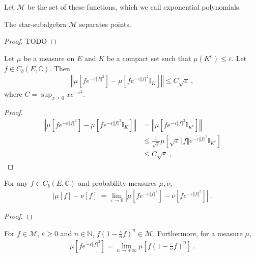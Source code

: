 Let $\mathcal M$ be the set of these functions, which we call exponential polynomials.

\begin{lemma}\label{lem:separating_expPoly}
The star-subalgebra $\mathcal M$ separates points.
\end{lemma}

\begin{proof}
TODO
\end{proof}

\begin{lemma}\label{lem:integral_restrict_compact}
Let $\mu$ be a measure on $E$ and $K$ be a compact set such that $\mu(K^c) \le \varepsilon$. Let $f \in C_b(E, \mathbb{C})$. Then
\begin{align*}
\left\Vert \mu[fe^{-\varepsilon \Vert f \Vert^2}] - \mu[f e^{-\varepsilon \Vert f \Vert^2} \mathbb{I}_K] \right\Vert
\le C \sqrt{\varepsilon} \: ,
\end{align*}
where $C = \sup_{x \ge 0} x e^{-x^2}$.
\end{lemma}

\begin{proof}
\begin{align*}
\left\Vert \mu[fe^{-\varepsilon \Vert f \Vert^2}] - \mu[f e^{-\varepsilon \Vert f \Vert^2} \mathbb{I}_K] \right\Vert
&= \left\Vert \mu[f e^{-\varepsilon \Vert f \Vert^2} \mathbb{I}_{K^c}] \right\Vert
\\
&\le \frac{1}{\sqrt{\varepsilon}} \mu \left[ \sqrt{\varepsilon} \Vert f \Vert e^{-\varepsilon \Vert f \Vert^2} \mathbb{I}_{K^c} \right]
\\
&\le C \sqrt{\varepsilon} \: ,
\end{align*}
\end{proof}

\begin{lemma}\label{lem:introduce_exponential}
For any $f \in C_b(E, \mathbb{C})$ and probability measures $\mu, \nu$,
\begin{align*}
\left\vert \mu[f] - \nu[f] \right\vert
= \lim_{\varepsilon \to 0} \left\vert \mu\left[f e^{-\varepsilon \Vert f \Vert^2} \right] - \nu\left[f e^{-\varepsilon \Vert f \Vert^2} \right] \right\vert
\: .
\end{align*}
\end{lemma}

\begin{proof}
\end{proof}

\begin{lemma}\label{lem:exponiential_M_eq_limit_M}
For $f \in \mathcal M$, $\varepsilon \ge 0$ and $n \in \mathbb{N}$, $f (1 - \frac{\varepsilon}{n} f)^n \in \mathcal M$. Furthermore, for a measure $\mu$,
\begin{align*}
\mu\left[f e^{-\varepsilon \Vert f \Vert^2}\right] = \lim_{n \to + \infty} \mu\left[f (1 - \frac{\varepsilon}{n} f)^n\right] \: .
\end{align*}
\end{lemma}

